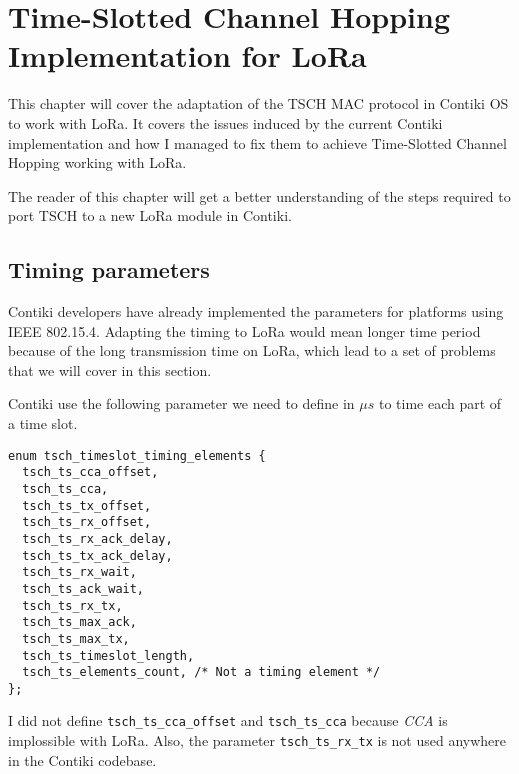 \chapter{Time-Slotted Channel Hopping Implementation for LoRa\label{section:tsch}}

This chapter will cover the adaptation of the TSCH MAC protocol in Contiki OS to
work with LoRa.
It covers the issues induced by the current Contiki implementation and how I
managed to fix them to achieve Time-Slotted Channel Hopping working with LoRa.

The reader of this chapter will get a better understanding of the steps
required to port TSCH to a new LoRa module in Contiki.

\section{Timing parameters\label{section:timingparameters}}

Contiki developers have already implemented the parameters for
platforms using IEEE 802.15.4.
Adapting the timing to LoRa would mean longer time period because of the long
transmission time on LoRa, which lead to a set of problems that we will cover in this
section.

Contiki use the following parameter we need to define in $\mu s$ to time each
part of a time slot.


\begin{lstlisting}
enum tsch_timeslot_timing_elements {
  tsch_ts_cca_offset,
  tsch_ts_cca,
  tsch_ts_tx_offset,
  tsch_ts_rx_offset,
  tsch_ts_rx_ack_delay,
  tsch_ts_tx_ack_delay,
  tsch_ts_rx_wait,
  tsch_ts_ack_wait,
  tsch_ts_rx_tx,
  tsch_ts_max_ack,
  tsch_ts_max_tx,
  tsch_ts_timeslot_length,
  tsch_ts_elements_count, /* Not a timing element */
};
\end{lstlisting}

I did not define \lstinline{tsch_ts_cca_offset} and \lstinline{tsch_ts_cca} 
because \emph{CCA} is implossible with LoRa.
Also, the parameter \lstinline{tsch_ts_rx_tx} is not used anywhere in the 
Contiki codebase.

